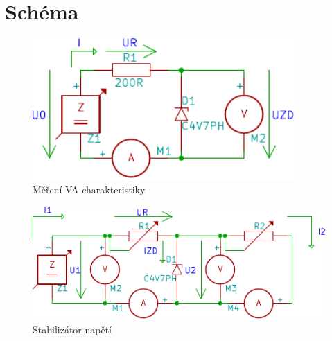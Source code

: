 \section{Schéma}
  \begin{figure}[H]
    \centering
    \includegraphics[width=10cm]{../img/VA-ZD.pdf}
    \caption{Měření VA charakteristiky}
    \label{sch:1}
  \end{figure}
  
  \begin{figure}[H]
    \centering
    \includegraphics[width=15cm]{../img/stab.pdf}
    \caption{Stabilizátor napětí}
    \label{sch:2}
  \end{figure}
